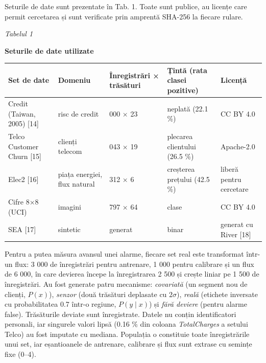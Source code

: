 \documentclass[12pt,a4paper]{article}
\begin{document}
Seturile de date sunt prezentate în Tab. 1. Toate sunt publice, au
licențe care permit cercetarea și sunt verificate prin amprentă SHA-256
la fiecare rulare.

\begin{flushright}\textit{\fontsize{11}{13}\selectfont Tabelul 1}\end{flushright}\vspace{-6pt}
\begin{center}{\fontsize{11}{13}\selectfont\bfseries Seturile de date utilizate}\end{center}\vspace{-6pt}
{\fontsize{10}{12}\selectfont
\begin{tabularx}{\textwidth}{|>{\raggedright\arraybackslash}X|>{\raggedright\arraybackslash}p{2.9cm}|>{\centering\arraybackslash}p{2.6cm}|>{\raggedright\arraybackslash}p{3.2cm}|>{\raggedright\arraybackslash}p{2.1cm}|}
\hline
\textbf{Set de date} & \textbf{Domeniu} & \textbf{Înregistrări × trăsături} & \textbf{Țintă (rata clasei pozitive)} & \textbf{Licență}\\\hline
Credit (Taiwan, 2005) [14] & risc de credit & 30 000 × 23 & neplată (22.1 \%) & CC BY 4.0\\\hline
Telco Customer Churn [15] & clienți telecom & 7 043 × 19 & plecarea clientului (26.5 \%) & Apache-2.0\\\hline
Elec2 [16] & piața energiei, flux natural & 45 312 × 6 & creșterea prețului (42.5 \%) & liberă pentru cercetare\\\hline
Cifre 8×8 (UCI) & imagini & 1 797 × 64 & 10 clase & CC BY 4.0\\\hline
SEA [17] & sintetic & generat & binar & generat cu River [18]\\\hline
\end{tabularx}}
\vspace{6pt}

Pentru a putea măsura avansul unei alarme, fiecare set real este
transformat într-un flux: 3 000 de înregistrări pentru antrenare, 1 000
pentru calibrare și un flux de 6 000, în care devierea începe la
înregistrarea 2 500 și crește liniar pe 1 500 de înregistrări. Au fost
generate patru mecanisme: \emph{covariată} (un segment nou de clienți,
\(P(x)\)), \emph{senzor} (două trăsături deplasate cu \(2\sigma\)),
\emph{reală} (etichete inversate cu probabilitatea 0.7 într-o regiune,
\(P(y\mid x)\)) și \emph{fără deviere} (pentru alarme false).
Trăsăturile deviate sunt înregistrate. Datele nu conțin identificatori
personali, iar singurele valori lipsă (0.16 \% din coloana
\emph{TotalCharges} a setului Telco) au fost imputate cu mediana.
Populația o constituie toate înregistrările unui set, iar eșantioanele
de antrenare, calibrare și flux sunt extrase cu semințe fixe (0--4).
\end{document}
